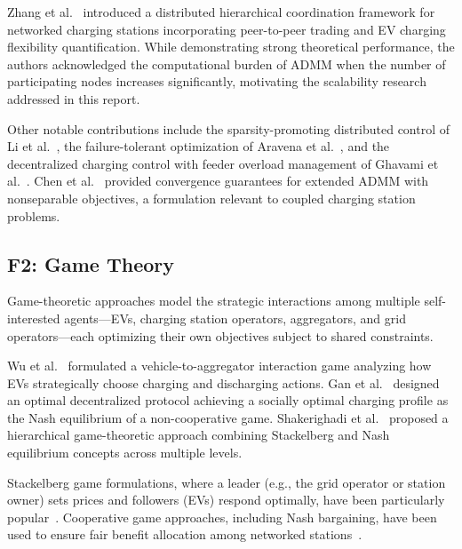 \documentclass[review]{elsarticle}
\begin{document}
\hspace{0.5cm}Zhang et al.~\cite{zhang2022distributed} introduced a distributed hierarchical coordination framework for networked charging stations incorporating peer-to-peer trading and EV charging flexibility quantification. While demonstrating strong theoretical performance, the authors acknowledged the computational burden of ADMM when the number of participating nodes increases significantly, motivating the scalability research addressed in this report.

\hspace{0.5cm}Other notable contributions include the sparsity-promoting distributed control of Li et al.~\cite{li2018sparsity}, the failure-tolerant optimization of Aravena et al.~\cite{aravena2021decentralized}, and the decentralized charging control with feeder overload management of Ghavami et al.~\cite{ghavami2016decentralized}. Chen et al.~\cite{chen2019extended} provided convergence guarantees for extended ADMM with nonseparable objectives, a formulation relevant to coupled charging station problems.


\subsection{F2: Game Theory}\label{sec:f2}

\hspace{0.5cm}Game-theoretic approaches model the strategic interactions among multiple self-interested agents---EVs, charging station operators, aggregators, and grid operators---each optimizing their own objectives subject to shared constraints.

\hspace{0.5cm}Wu et al.~\cite{wu2012v2a} formulated a vehicle-to-aggregator interaction game analyzing how EVs strategically choose charging and discharging actions. Gan et al.~\cite{gan2013optimal} designed an optimal decentralized protocol achieving a socially optimal charging profile as the Nash equilibrium of a non-cooperative game. Shakerighadi et al.~\cite{shakerighadi2018hierarchical} proposed a hierarchical game-theoretic approach combining Stackelberg and Nash equilibrium concepts across multiple levels.

\hspace{0.5cm}Stackelberg game formulations, where a leader (e.g., the grid operator or station owner) sets prices and followers (EVs) respond optimally, have been particularly popular~\cite{tan2017realtime,zhao2018realtime,guo2023hierarchical}. Cooperative game approaches, including Nash bargaining, have been used to ensure fair benefit allocation among networked stations~\cite{wang2020network,gao2024realtime}.
\end{document}
